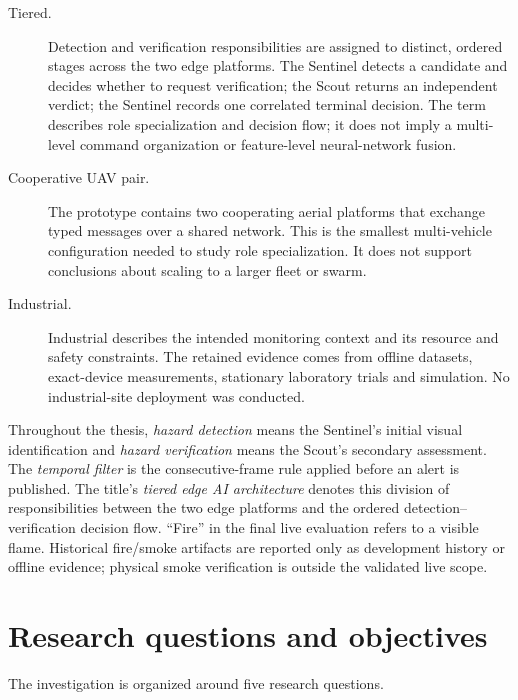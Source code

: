 \begin{description}
  \item[Tiered.] Detection and verification responsibilities are assigned to
  distinct, ordered stages across the two edge platforms. The Sentinel detects
  a candidate and decides whether to request verification; the Scout returns an
  independent verdict; the Sentinel records one correlated terminal decision.
  The term describes role specialization and decision flow; it does not imply
  a multi-level command organization or feature-level neural-network fusion.

  \item[Cooperative UAV pair.] The prototype contains two cooperating aerial
  platforms that exchange typed messages over a shared network. This is the
  smallest multi-vehicle configuration needed to study role specialization. It
  does not support conclusions about scaling to a larger fleet or swarm.

  \item[Industrial.] Industrial describes the intended monitoring context and
  its resource and safety constraints. The retained evidence comes from
  offline datasets, exact-device measurements, stationary laboratory trials
  and simulation. No industrial-site deployment was conducted.
\end{description}

Throughout the thesis, \emph{hazard detection} means the Sentinel's initial
visual identification and \emph{hazard verification} means the Scout's
secondary assessment. The \emph{temporal filter} is the consecutive-frame rule
applied before an alert is published. The title's \emph{tiered edge AI
architecture} denotes this division of responsibilities between the two edge
platforms and the ordered detection--verification decision flow. ``Fire'' in
the final live evaluation refers to a visible flame.
Historical fire/smoke artifacts are reported only as development history or
offline evidence; physical smoke verification is outside the validated live
scope.

\section{Research questions and objectives}
\label{sec:introduction:rqs}

The investigation is organized around five research questions.

